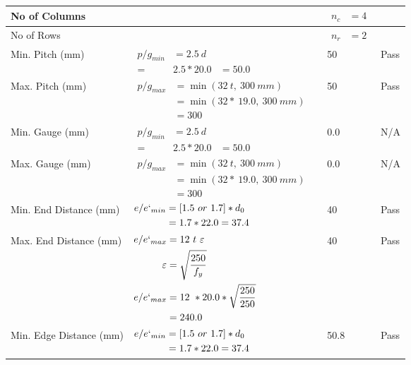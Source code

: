 \documentclass{article}%
\begin{document}
\begin{longtable}{|p{4cm}|p{5cm}|p{5.5cm}|p{1.5cm}|}
No of Columns&&$\begin{aligned} n_c &=4\end{aligned}$&\\%
\hline%
No of Rows&&$\begin{aligned} n_r &=2\end{aligned}$&\\%
\hline%
Min. Pitch (mm)&$\begin{aligned}p/g_{min}&= 2.5 ~ d&\\ =&2.5*20.0&=50.0\end{aligned}$&50&Pass\\%
\hline%
Max. Pitch (mm)&$\begin{aligned}p/g_{max} &=\min(32~t,~300~mm)&\\ &=\min(32 *~19.0,~ 300 ~mm)\\&=300\end{aligned}$&50&Pass\\%
\hline%
Min. Gauge (mm)&$\begin{aligned}p/g_{min}&= 2.5 ~ d&\\ =&2.5*20.0&=50.0\end{aligned}$&0.0&N/A\\%
\hline%
Max. Gauge (mm)&$\begin{aligned}p/g_{max} &=\min(32~t,~300~mm)&\\ &=\min(32 *~19.0,~ 300 ~mm)\\&=300\end{aligned}$&0.0&N/A\\%
\hline%
Min. End Distance (mm)&$\begin{aligned}e/e`_{min} &=[1.5~or~ 1.7] * d_0\\ &=1.7*22.0=37.4 \end{aligned}$&40&Pass\\%
\hline%
Max. End Distance (mm)&$\begin{aligned}e/e`_{max} &= 12~ t~ \varepsilon&\\ \varepsilon &= \sqrt{\frac{250}{f_y}}\\ e/e`_{max}&=12 ~*20.0*\sqrt{\frac{250}{250}}\\ &=240.0\\ \end{aligned}$&40&Pass\\%
\hline%
Min. Edge Distance (mm)&$\begin{aligned}e/e`_{min} &=[1.5~or~ 1.7] * d_0\\ &=1.7*22.0=37.4 \end{aligned}$&50.8&Pass\\%

\end{longtable}
\end{document}
